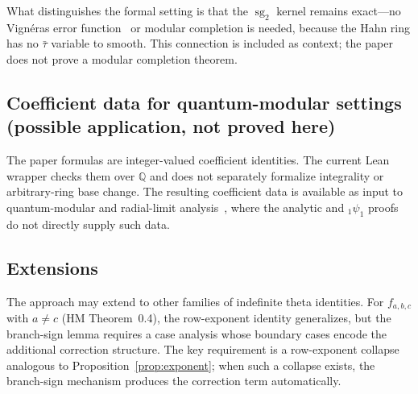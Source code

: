 \documentclass[11pt]{article}
\newcommand{\Q}{\mathbb{Q}}
\newcommand{\sgtwo}{\operatorname{sg}_2}
\begin{document}
What distinguishes the formal
setting is that the $\sgtwo$ kernel remains exact---no Vign\'eras
error function~\cite{oVi77} or modular completion is needed,
because the Hahn ring has no $\bar\tau$ variable to smooth.
This connection is included as context; the paper does not prove
a modular completion theorem.

\subsection*{Coefficient data for quantum-modular settings
  (possible application, not proved here)}

The paper formulas are integer-valued coefficient identities.  The current
Lean wrapper checks them over $\Q$ and does not separately formalize
integrality or arbitrary-ring base change.  The resulting coefficient data
is available as input to quantum-modular and radial-limit
analysis~\cite{jZag10,jFOR13}, where the analytic and
${}_1\psi_1$ proofs do not directly supply such data.

\subsection*{Extensions}

The approach may extend to other families of indefinite theta
identities.  For $f_{a,b,c}$ with $a\neq c$ (HM Theorem~0.4),
the row-exponent identity generalizes, but the branch-sign lemma
requires a case analysis whose boundary cases encode the
additional correction structure.  The key requirement is a
row-exponent collapse analogous to Proposition~\ref{prop:exponent};
when such a collapse exists, the branch-sign mechanism produces the
correction term automatically.





\end{document}

